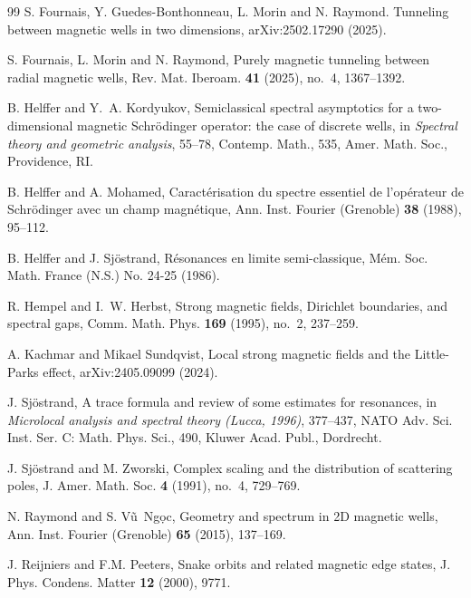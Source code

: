 \documentclass[11pt]{amsart}
\theoremstyle{remark}
\numberwithin{equation}{section}
\begin{document}
\begin{thebibliography}{99}
 S. Fournais, Y. Guedes-Bonthonneau, L. Morin and  N. Raymond. Tunneling between magnetic wells in two dimensions, arXiv:2502.17290 (2025).

 S. Fournais, L. Morin and N. Raymond, Purely magnetic tunneling between radial magnetic wells, Rev. Mat. Iberoam. {\bf 41} (2025), no.~4, 1367--1392.



 B. Helffer and Y.~A. Kordyukov, Semiclassical spectral asymptotics for a two-dimensional magnetic Schr\"odinger operator: the case of discrete wells, in {\it Spectral theory and geometric analysis}, 55--78, Contemp. Math., 535, Amer. Math. Soc., Providence, RI.

 B. Helffer and A. Mohamed, Caract\'erisation du spectre essentiel de l'op\'erateur de Schr\"odinger avec un champ magn\'etique, Ann. Inst. Fourier (Grenoble) {\bf 38} (1988),  95--112.


 B. Helffer and J. Sj\"ostrand, R\'esonances en limite semi-classique, M\'em. Soc. Math. France (N.S.) No. 24-25 (1986).

 R. Hempel and I.~W. Herbst, Strong magnetic fields, Dirichlet boundaries, and spectral gaps, Comm. Math. Phys. {\bf 169} (1995), no.~2, 237--259.

  A. Kachmar and Mikael Sundqvist, Local strong magnetic fields and the Little-Parks effect,
arXiv:2405.09099 (2024). 

 J. Sj\"ostrand, A trace formula and review of some estimates for resonances, in {\it Microlocal analysis and spectral theory (Lucca, 1996)}, 377--437, NATO Adv. Sci. Inst. Ser. C: Math. Phys. Sci., 490, Kluwer Acad. Publ., Dordrecht.

 J. Sj\"ostrand and M. Zworski, Complex scaling and the distribution of scattering poles, J. Amer. Math. Soc. {\bf 4} (1991), no.~4, 729--769.

 N. Raymond and S. V\~u~Ng\d oc, Geometry and spectrum in 2D magnetic wells, Ann. Inst. Fourier (Grenoble) {\bf 65} (2015),  137--169.

 J. Reijniers and F.M. Peeters, Snake orbits and related magnetic edge states, J. Phys. Condens. Matter {\bf 12} (2000), 9771.


\end{thebibliography}
\end{document}
